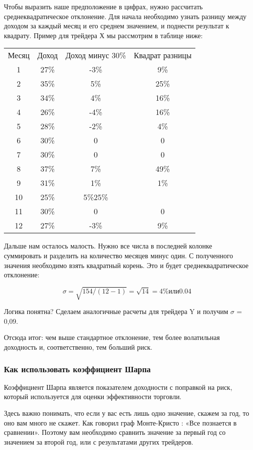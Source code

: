 \documentclass[a5paper]{article}
\begin{document}
Чтобы выразить наше предположение в цифрах, нужно рассчитать
среднеквадратическое отклонение. Для начала необходимо узнать разницу
между доходом за каждый месяц и его среднем значением, и поднести
результат к квадрату. Пример для трейдера Х мы рассмотрим в таблице
ниже:

\begin{tabular}{cccc}
Месяц&Доход&Доход минус 30\%&Квадрат разницы\\
1&27\%&-3\%&9\%\\
2&35\%&5\%&25\%\\
3&34\%&4\%&16\%\\
4&26\%&-4\%&16\%\\
5&28\%&-2\%&4\%\\
6&30\%&0&0\\
7&30\%&0&0\\
8&37\%&7\%&49\%\\
9&31\%&1\%&1\%\\
10&25\%&5\%25\%\\
11&30\%&0&0\\
12&27\%&-3\%&9\%\\
\end{tabular}

Дальше нам осталось малость. Нужно все числа в последней колонке суммировать и разделить на количество месяцев минус один. С полученного значения необходимо взять квадратный корень. Это и будет среднеквадратическое отклонение:

$$\sigma = \sqrt{154/(12-1)} = \sqrt{14} = 4\% или 0.04$$

Логика понятна? Сделаем аналогичные расчеты для трейдера Y и получим $\sigma$ = 0,09.

    Отсюда итог: чем выше стандартное отклонение, тем более волатильная доходность и, соответственно, тем больший риск.

\subsubsection{Как использовать коэффициент Шарпа}

Коэффициент Шарпа является показателем доходности с поправкой на риск, который используется для оценки эффективности торговли.

Здесь важно понимать, что если у вас есть лишь одно значение, скажем за год, то оно вам много не скажет. Как говорил граф Монте-Кристо : «Все познается в сравнении». Поэтому вам необходимо сравнить значение за первый год со значением за второй год, или с результатами других трейдеров.
\end{document}
